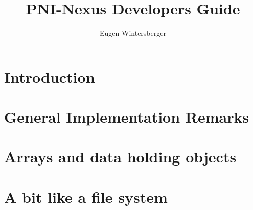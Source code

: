 \documentclass[a4paper]{book}
\author{Eugen Wintersberger}
\title{PNI-Nexus Developers Guide}
\begin{document}
\maketitle
\tableofcontents

\chapter{Introduction}

\chapter{General Implementation Remarks}


\chapter{Arrays and data holding objects}

\chapter{A bit like a file system}
\end{document}
